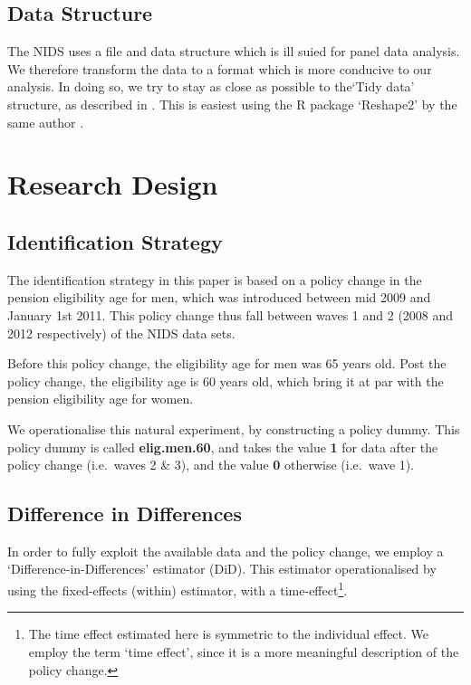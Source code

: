 \begin{refsection}
\subsection{Data Structure}
The NIDS uses a file and data structure which is ill suied for panel data analysis.
We therefore transform the data to a format which is more conducive to our analysis.
In doing so, we try to stay as close as possible to the`Tidy data' structure, as described in \textcite{wickham2014tidy}.
This is easiest using the R package `Reshape2' by the same author \parencite[Reshape2 implementation]{wickham2007reshaping}.

\section{Research Design}



\subsection{Identification Strategy}
\label{sa:identification}
The identification strategy in this paper is based on a policy change in the pension eligibility age for men,
which was introduced between mid 2009 and January 1st 2011.
This policy change thus fall between waves 1 and 2 (2008 and 2012 respectively) of the NIDS data sets.

Before this policy change, the eligibility age for men was 65 years old.
Post the policy change, the eligibility age is 60 years old,
which bring it at par with the pension eligibility age for women.

We operationalise this natural experiment, by constructing a policy dummy.
This policy dummy is called \textbf{elig.men.60}, and takes the value \textbf{1}
for data after the policy change (i.e.~waves 2 \& 3), and the value \textbf{0} otherwise (i.e.~wave 1).

\subsection{Difference in Differences}
In order to fully exploit the available data and the policy change,
we employ a `Difference-in-Differences' estimator (DiD).
This estimator operationalised by using the fixed-effects (within) estimator, with a time-effect\footnote{The time effect estimated here is symmetric to the individual effect.
We employ the term `time effect', since it is a more meaningful description of the policy change.}.


\end{refsection}
